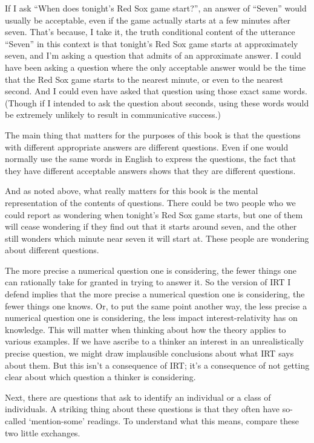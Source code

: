 \documentclass[11pt,]{book}
\begin{document}
If I ask ``When does tonight's Red Sox game start?'', an answer of ``Seven'' would usually be acceptable, even if the game actually starts at a few minutes after seven. That's because, I take it, the truth conditional content of the utterance ``Seven'' in this context is that tonight's Red Sox game starts at approximately seven, and I'm asking a question that admits of an approximate answer. I could have been asking a question where the only acceptable answer would be the time that the Red Sox game starts to the nearest minute, or even to the nearest second. And I could even have asked that question using those exact same words. (Though if I intended to ask the question about seconds, using these words would be extremely unlikely to result in communicative success.)

The main thing that matters for the purposes of this book is that the questions with different appropriate answers are different questions. Even if one would normally use the same words in English to express the questions, the fact that they have different acceptable answers shows that they are different questions.

And as noted above, what really matters for this book is the mental representation of the contents of questions. There could be two people who we could report as wondering when tonight's Red Sox game starts, but one of them will cease wondering if they find out that it starts around seven, and the other still wonders which minute near seven it will start at. These people are wondering about different questions.

The more precise a numerical question one is considering, the fewer things one can rationally take for granted in trying to answer it. So the version of IRT I defend implies that the more precise a numerical question one is considering, the fewer things one knows. Or, to put the same point another way, the less precise a numerical question one is considering, the less impact interest-relativity has on knowledge. This will matter when thinking about how the theory applies to various examples. If we have ascribe to a thinker an interest in an unrealistically precise question, we might draw implausible conclusions about what IRT says about them. But this isn't a consequence of IRT; it's a consequence of not getting clear about which question a thinker is considering.

Next, there are questions that ask to identify an individual or a class of individuals. A striking thing about these questions is that they often have so-called `mention-some' readings. To understand what this means, compare these two little exchanges.
\end{document}
